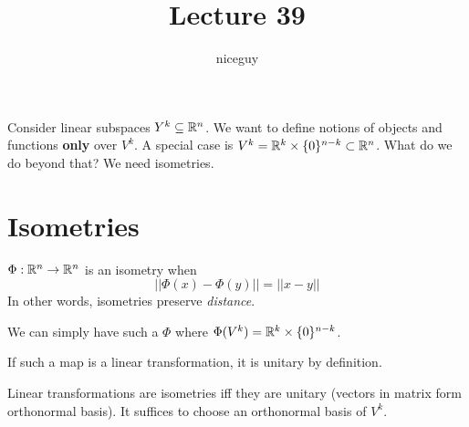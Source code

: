 \documentclass[12pt]{article}
\title{Lecture 39}
\author{niceguy}
\begin{document}
\maketitle

Consider linear subspaces $Y^k \subseteq \mathbb{R}^n$. We want to define notions of objects and functions \textbf{only} over $V^k$. A special case is $V^k = \mathbb{R}^k \times \{0\}^{n-k} \subset \mathbb{R}^n$. What do we do beyond that? We need isometries.

\section{Isometries}

\begin{defn}[Isometry]
    $\Phi:\mathbb{R}^n \rightarrow \mathbb{R}^n$ is an isometry when
    $$||\Phi(x) - \Phi(y)|| = ||x - y||$$
    In other words, isometries preserve \textit{distance}.
\end{defn}

We can simply have such a $\Phi$ where $\Phi(V^k) = \mathbb{R}^k \times \{0\}^{n-k}$.

\begin{ex}
    If such a map is a linear transformation, it is unitary by definition.
\end{ex}

Linear transformations are isometries iff they are unitary (vectors in matrix form orthonormal basis). It suffices to choose an orthonormal basis of $V^k$.
\end{document}
